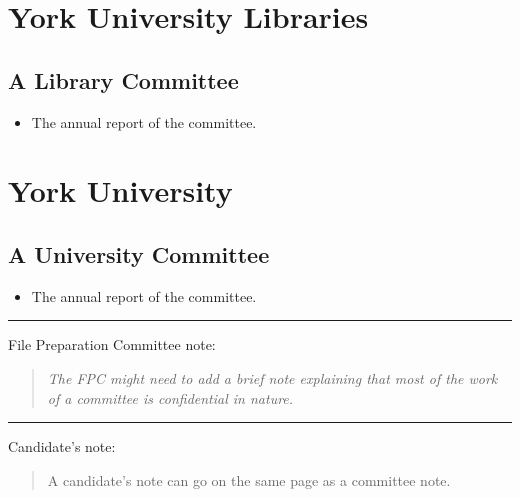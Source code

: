 \documentclass[12pt,oneside]{book}
\newcommand{\candidatenote}[1] {%
\par\noindent\rule{\textwidth}{1pt}
{\large Candidate's note:}
\begin{quote}
  \fontfamily{phv}\selectfont
  {\small #1}
\end{quote}
}
\newcommand{\committeenote}[1] {%
\par\noindent\rule{\textwidth}{1pt}
{\large File Preparation Committee note:}
\begin{quote}
  \itshape{}
  {\small #1}
\end{quote}
}
\begin{document}
\section{York University Libraries}

\subsection{A Library Committee}

\begin{itemize}
  \item The annual report of the committee.
\end{itemize}



\section{York University}

\subsection{A University Committee}

\begin{itemize}
  \item The annual report of the committee.
\end{itemize}

\committeenote{The FPC might need to add a brief note explaining that most of the work of a committee is confidential in nature.}

\candidatenote{A candidate's note can go on the same page as a committee note.}


\end{document}
